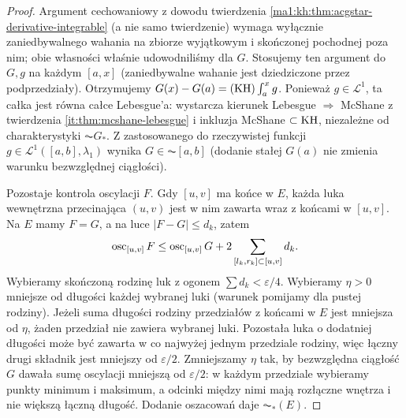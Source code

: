 \begin{proof}
Argument cechowaniowy z dowodu twierdzenia \ref{ma1:kh:thm:acgstar-derivative-integrable} (a nie samo twierdzenie) wymaga wyłącznie zaniedbywalnego wahania na zbiorze wyjątkowym i skończonej pochodnej poza nim; obie własności właśnie udowodniliśmy dla $G$. Stosujemy ten argument do $G,g$ na każdym $[a,x]$ (zaniedbywalne wahanie jest dziedziczone przez podprzedziały). Otrzymujemy $G(x)-G(a)=(\mathrm{KH})\int_a^x g$. Ponieważ $g\in\mathcal L^1$, ta całka jest równa całce Lebesgue'a: wystarcza kierunek Lebesgue $\Rightarrow$ McShane z twierdzenia \ref{it:thm:mcshane-lebesgue} i inkluzja McShane $\subset\mathrm{KH}$, niezależne od charakterystyki $\AC G_*$. Z  zastosowanego do rzeczywistej funkcji $g\in\mathcal L^1([a,b],\lambda_1)$ wynika $G\in\AC[a,b]$ (dodanie stałej $G(a)$ nie zmienia warunku bezwzględnej ciągłości).

Pozostaje kontrola oscylacji $F$. Gdy $[u,v]$ ma końce w $E$, każda luka wewnętrzna przecinająca $(u,v)$ jest w nim zawarta wraz z końcami w $[u,v]$. Na $E$ mamy $F=G$, a na luce $|F-G|\le d_k$, zatem
\[
 \operatorname{osc}_{[u,v]}F\le\operatorname{osc}_{[u,v]}G+
        2\sum_{[l_k,r_k]\subset[u,v]}d_k.
\]
Wybieramy skończoną rodzinę luk z ogonem $\sum d_k<\varepsilon/4$. Wybieramy $\eta>0$ mniejsze od długości każdej wybranej luki (warunek pomijamy dla pustej rodziny). Jeżeli suma długości rodziny przedziałów z końcami w $E$ jest mniejsza od $\eta$, żaden przedział nie zawiera wybranej luki. Pozostała luka o dodatniej długości może być zawarta w co najwyżej jednym przedziale rodziny, więc łączny drugi składnik jest mniejszy od $\varepsilon/2$. Zmniejszamy $\eta$ tak, by bezwzględna ciągłość $G$ dawała sumę oscylacji mniejszą od $\varepsilon/2$: w każdym przedziale wybieramy punkty minimum i maksimum, a odcinki między nimi mają rozłączne wnętrza i nie większą łączną długość. Dodanie oszacowań daje $\AC_*(E)$.
\end{proof}

